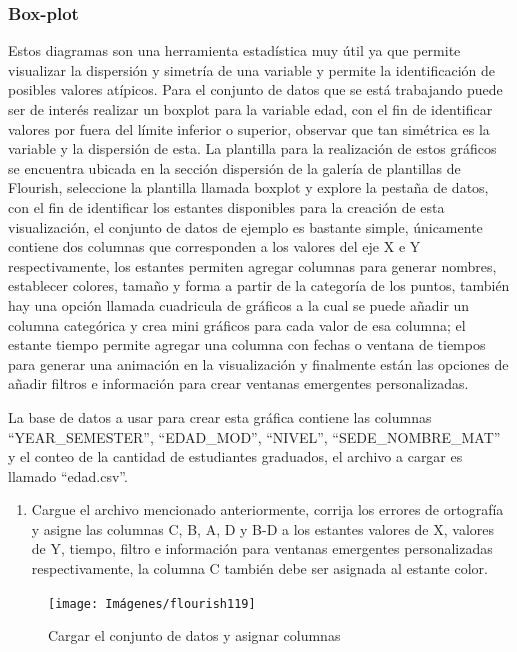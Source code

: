 \documentclass[
]{book}
\providecommand{\tightlist}{%
  \setlength{\itemsep}{0pt}\setlength{\parskip}{0pt}}
\begin{document}
\hypertarget{boxplotflourish}{%
\subsubsection{Box-plot}\label{boxplotflourish}}

Estos diagramas son una herramienta estadística muy útil ya que permite visualizar la dispersión y simetría de una variable y permite la identificación de posibles valores atípicos. Para el conjunto de datos que se está trabajando puede ser de interés realizar un boxplot para la variable edad, con el fin de identificar valores por fuera del límite inferior o superior, observar que tan simétrica es la variable y la dispersión de esta. La plantilla para la realización de estos gráficos se encuentra ubicada en la sección dispersión de la galería de plantillas de Flourish, seleccione la plantilla llamada boxplot y explore la pestaña de datos, con el fin de identificar los estantes disponibles para la creación de esta visualización, el conjunto de datos de ejemplo es bastante simple, únicamente contiene dos columnas que corresponden a los valores del eje X e Y respectivamente, los estantes permiten agregar columnas para generar nombres, establecer colores, tamaño y forma a partir de la categoría de los puntos, también hay una opción llamada cuadricula de gráficos a la cual se puede añadir un columna categórica y crea mini gráficos para cada valor de esa columna; el estante tiempo permite agregar una columna con fechas o ventana de tiempos para generar una animación en la visualización y finalmente están las opciones de añadir filtros e información para crear ventanas emergentes personalizadas.

La base de datos a usar para crear esta gráfica contiene las columnas ``YEAR\_SEMESTER'', ``EDAD\_MOD'', ``NIVEL'', ``SEDE\_NOMBRE\_MAT'' y el conteo de la cantidad de estudiantes graduados, el archivo a cargar es llamado ``edad.csv''.

\begin{enumerate}
\def\labelenumi{\arabic{enumi}.}
\tightlist
\item
  Cargue el archivo mencionado anteriormente, corrija los errores de ortografía y asigne las columnas C, B, A, D y B-D a los estantes valores de X, valores de Y, tiempo, filtro e información para ventanas emergentes personalizadas respectivamente, la columna C también debe ser asignada al estante color.
\end{enumerate}

\begin{figure}

{\centering \texttt{[image: Imágenes/flourish119]} 

}

\caption{Cargar el conjunto de datos y asignar columnas}\label{fig:paso1boxplotflourish-fig}
\end{figure}
\end{document}
